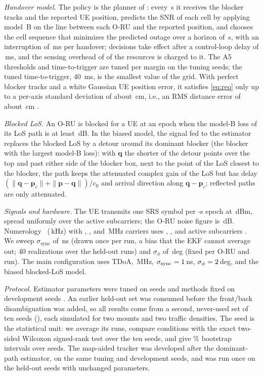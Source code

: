 \documentclass[conference]{IEEEtran}
\begin{document}
\textit{Handover model.} The policy is the planner of
\cite{natanzi2027companion}: every \pEpoch\,s it receives the blocker
tracks and the reported UE position, predicts the SNR of each cell by
applying model~B on the line between each O-RU and the reported
position, and chooses the cell sequence that minimizes the predicted
outage over a horizon of \pPlanH\,s, with an interruption of \pTauHO\,ms
per handover; decisions take effect after a control-loop delay of
\pLoopDelay\,ms, and the sensing overhead of \pOverhead{} of the
resources is charged to it. The A5 thresholds and time-to-trigger are
tuned per margin on the tuning seeds; the tuned time-to-trigger,
\SI{40}{ms}, is the smallest value of the grid. With perfect blocker tracks and a white
Gaussian UE position error, it satisfies \eqref{eq:req} only up to a
per-axis standard deviation of about \pBreakEven\,cm, i.e., an RMS
distance error of about \pBreakEvenRms\,cm \cite{natanzi2027companion}.

\textit{Blocked LoS.} An O-RU is blocked for a UE at an epoch when the
model-B loss of its LoS path is at least \pBlockedDb\,dB. In the biased
model, the signal fed to the estimator replaces the blocked LoS by a
detour around its dominant blocker (the blocker with the largest model-B
loss): with $\mathbf q$ the shorter of the detour points over the top
and past either side of the blocker box, next to the point of the LoS
closest to the blocker, the path keeps the attenuated complex gain of
the LoS but has delay
$(\|\mathbf q-\mathbf p_c\|+\|\mathbf p-\mathbf q\|)/c_0$ and arrival
direction along $\mathbf q-\mathbf p_c$; reflected paths are only
attenuated.

\textit{Signals and hardware.} The UE transmits one SRS symbol per
\pEpoch-s epoch at \pTxPower\,dBm, spread uniformly over the active
subcarriers; the O-RU noise figure is
\pNoiseFig\,dB. Numerology~\pNumerology{} (\pScs\,kHz) with \pBwA,
\pBwB, and \pBwC\,MHz carriers uses \pNscA, \pNscB, and \pNscC{} active
subcarriers \cite{3gpp38101_2}. We sweep
$\sigma_{\mathrm{sync}}$ of \pSyncListShown\,ns (drawn once per run, a
bias that the EKF cannot average out; 40 realizations over the held-out
runs) and $\sigma_\phi$ of \pPhiList\,deg
(fixed per O-RU and run). The main configuration uses TDoA, \pBwC\,MHz,
$\sigma_{\mathrm{sync}}=1$\,ns, $\sigma_\phi=2$\,deg, and
the biased blocked-LoS model.

\textit{Protocol.} Estimator parameters were tuned on seeds
\pSeedsTune{} and methods fixed on development seeds \pSeedsDev. An
earlier held-out set was consumed before the front/back disambiguation
was added, so all results come from a second, never-used set of ten
seeds (\pSeedsHeld), each simulated for two mounts and two traffic
densities. The seed is the statistical unit: we average its runs,
compare conditions with the exact two-sided Wilcoxon signed-rank test
over the ten seeds, and give \pCi\% bootstrap intervals over seeds.
The map-aided tracker was developed after the dominant-path estimator,
on the same tuning and development seeds, and was run once on the
held-out seeds with unchanged parameters.
\end{document}
